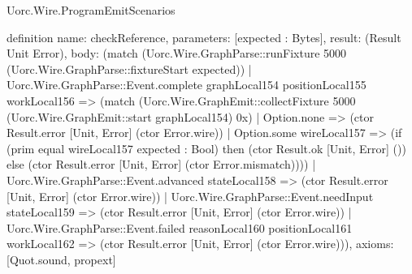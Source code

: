 \begin{lexlean}{Uorc.Wire.ProgramEmitScenarios}
\begin{semanticmodule}
definition{
  name: checkReference,
  parameters: [expected : Bytes],
  result: (Result Unit Error),
  body: (match (Uorc.Wire.GraphParse::runFixture 5000 (Uorc.Wire.GraphParse::fixtureStart expected))
    | Uorc.Wire.GraphParse::Event.complete graphLocal154 positionLocal155 workLocal156 => (match (Uorc.Wire.GraphEmit::collectFixture 5000 (Uorc.Wire.GraphEmit::start graphLocal154) 0x)
      | Option.none => (ctor Result.error [Unit, Error] (ctor Error.wire))
      | Option.some wireLocal157 => (if (prim equal wireLocal157 expected : Bool) then (ctor Result.ok [Unit, Error] ()) else (ctor Result.error [Unit, Error] (ctor Error.mismatch))))
    | Uorc.Wire.GraphParse::Event.advanced stateLocal158 => (ctor Result.error [Unit, Error] (ctor Error.wire))
    | Uorc.Wire.GraphParse::Event.needInput stateLocal159 => (ctor Result.error [Unit, Error] (ctor Error.wire))
    | Uorc.Wire.GraphParse::Event.failed reasonLocal160 positionLocal161 workLocal162 => (ctor Result.error [Unit, Error] (ctor Error.wire))),
  axioms: [Quot.sound, propext]
}


\end{semanticmodule}
\end{lexlean}
